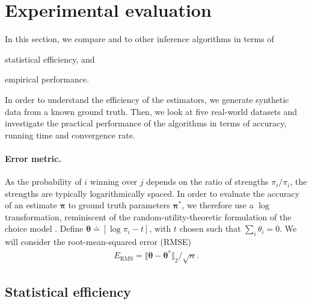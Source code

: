 \section{Experimental evaluation}
\label{fi:sec:experimental}

In this section, we compare \LSR{} and \ILSR{} to other inference algorithms in terms of
\begin{enuminline}
\item statistical efficiency, and
\item empirical performance.
\end{enuminline}
In order to understand the efficiency of the estimators, we generate synthetic data from a known ground truth.
Then, we look at five real-world datasets and investigate the practical performance of the algorithms in terms of accuracy, running time and convergence rate.

\paragraph{Error metric.}
As the probability of $i$ winning over $j$ depends on the ratio of strengths $\pi_i / \pi_i$, the strengths are typically logarithmically spaced.
In order to evaluate the accuracy of an estimate $\bm{\pi}$ to ground truth parameters $\bm{\pi}^*$, we therefore use a $\log$ transformation, reminiscent of the random-utility-theoretic formulation of the choice model \citep{mcfadden1973conditional,hajek2014minimax}.
Define $\bm{\theta} \doteq[\log \pi_i - t]$, with $t$ chosen such that $\sum_i \theta_i = 0$.
We will consider the root-mean-squared error (RMSE)
\begin{align*}
E_{\text{RMS}} = \Vert \bm{\theta} - \bm{\theta}^* \Vert_2 / \sqrt{n}.
\end{align*}

\subsection{Statistical efficiency}

